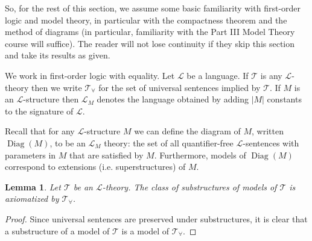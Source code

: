 \documentclass{article}
\theoremstyle{plain}
\newtheorem{lem}[thm]{Lemma}
\theoremstyle{definition}
\DeclareMathOperator{\Diag}{Diag}
\begin{document}
	So, for the rest of this section, we assume some basic familiarity with first-order logic and model theory, in particular with the compactness theorem and the method of diagrams (in particular, familiarity with the Part III Model Theory course will suffice). The reader will not lose continuity if they skip this section and take its results as given.
	
	We work in first-order logic with equality. Let $\mathcal{L}$ be a language. If $\mathcal{T}$ is any $\mathcal{L}$-theory then we write $\mathcal{T}_{\forall}$ for the set of universal sentences implied by $\mathcal{T}$. If $M$ is an $\mathcal{L}$-structure then $\mathcal{L}_M$ denotes the language obtained by adding $|M|$ constants to the signature of $\mathcal{L}$.
	
	Recall that for any $\mathcal{L}$-structure $M$ we can define the diagram of $M$, written $\Diag(M)$, to be an $\mathcal{L}_M$ theory: the set of all quantifier-free $\mathcal{L}$-sentences with parameters in $M$ that are satisfied by $M$. Furthermore, models of $\Diag(M)$ correspond to extensions (i.e. superstructures) of $M$.
	
	\begin{lem}
		Let $\mathcal{T}$ be an $\mathcal{L}$-theory. The class of substructures of models of $\mathcal{T}$ is axiomatized by $\mathcal{T}_{\forall}$.
	\end{lem}
	\begin{proof}
		Since universal sentences are preserved under substructures, it is clear that a substructure of a model of $\mathcal{T}$ is a model of $\mathcal{T}_{\forall}$.
	\end{proof}
	\printbibliography
	
\end{document}
